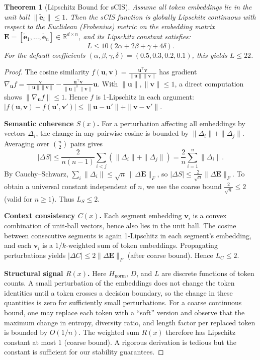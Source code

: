 \documentclass[11pt]{article}
\newtheorem{theorem}{Theorem}
\theoremstyle{definition}
\begin{document}
\begin{theorem}[Lipschitz Bound for sCIS]\label{thm:lipschitz}
Assume all token embeddings lie in the unit ball $\|\tilde{\mathbf{e}}_i\| \le 1$. Then the sCIS function is globally Lipschitz continuous with respect to the Euclidean (Frobenius) metric on the embedding matrix $\mathbf{E} = [\tilde{\mathbf{e}}_1, \dots, \tilde{\mathbf{e}}_n] \in \mathbb{R}^{d \times n}$, and its Lipschitz constant satisfies:
\[
L \le 10 \left( 2\alpha + 2\beta + \gamma + 4\delta \right).
\]
For the default coefficients $(\alpha,\beta,\gamma,\delta) = (0.5, 0.3, 0.2, 0.1)$, this yields $L \le 22$.
\end{theorem}

\begin{proof}
The cosine similarity $f(\mathbf{u},\mathbf{v}) = \frac{\mathbf{u}^\top\mathbf{v}}{\|\mathbf{u}\|\|\mathbf{v}\|}$ has gradient $\nabla_{\mathbf{u}} f = \frac{\mathbf{v}}{\|\mathbf{u}\|\|\mathbf{v}\|} - \frac{\mathbf{u}^\top\mathbf{v}}{\|\mathbf{u}\|^3\|\mathbf{v}\|}\mathbf{u}$. With $\|\mathbf{u}\|,\|\mathbf{v}\|\le 1$, a direct computation shows $\|\nabla_{\mathbf{u}} f\|\le 1$. Hence $f$ is 1‑Lipschitz in each argument: $|f(\mathbf{u},\mathbf{v})-f(\mathbf{u}',\mathbf{v}')|\le \|\mathbf{u}-\mathbf{u}'\|+\|\mathbf{v}-\mathbf{v}'\|$.

\textbf{Semantic coherence $S(x)$.} For a perturbation affecting all embeddings by vectors $\Delta_i$, the change in any pairwise cosine is bounded by $\|\Delta_i\|+\|\Delta_j\|$. Averaging over $\binom{n}{2}$ pairs gives
\[
|\Delta S| \le \frac{2}{n(n-1)}\sum_{i<j}(\|\Delta_i\|+\|\Delta_j\|) = \frac{2}{n}\sum_{i=1}^n \|\Delta_i\|.
\]
By Cauchy–Schwarz, $\sum_i\|\Delta_i\| \le \sqrt{n}\,\|\Delta\mathbf{E}\|_F$, so $|\Delta S| \le \frac{2}{\sqrt{n}}\|\Delta\mathbf{E}\|_F$. To obtain a universal constant independent of $n$, we use the coarse bound $\frac{2}{\sqrt{n}}\le 2$ (valid for $n\ge 1$). Thus $L_S \le 2$.

\textbf{Context consistency $C(x)$.} Each segment embedding $\mathbf{v}_i$ is a convex combination of unit‑ball vectors, hence also lies in the unit ball. The cosine between consecutive segments is again 1‑Lipschitz in each segment's embedding, and each $\mathbf{v}_i$ is a $1/k$‑weighted sum of token embeddings. Propagating perturbations yields $|\Delta C| \le 2\|\Delta\mathbf{E}\|_F$ (after coarse bound). Hence $L_C \le 2$.

\textbf{Structural signal $R(x)$.} Here $H_{\text{norm}}$, $D$, and $L$ are discrete functions of token counts. A small perturbation of the embeddings does not change the token identities until a token crosses a decision boundary, so the change in these quantities is zero for sufficiently small perturbations. For a coarse continuous bound, one may replace each token with a “soft” version and observe that the maximum change in entropy, diversity ratio, and length factor per replaced token is bounded by $O(1/n)$. The weighted sum $R(x)$ therefore has Lipschitz constant at most $1$ (coarse bound). A rigorous derivation is tedious but the constant is sufficient for our stability guarantees.


\end{proof}
\end{document}
